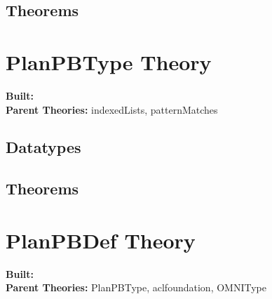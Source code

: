 \documentclass[11pt, twoside]{article}
\begin{document}


\subsection{Theorems}

\HOLssmPlanPBTheorems

\section{PlanPBType Theory}
\begin{flushleft}
\textbf{Built:} \HOLPlanPBTypeDate \\[2pt]
\textbf{Parent Theories:} indexedLists, patternMatches
\end{flushleft}

\subsection{Datatypes}

\HOLPlanPBTypeDatatypes


\subsection{Theorems}

\HOLPlanPBTypeTheorems

\section{PlanPBDef Theory}
\begin{flushleft}
\textbf{Built:} \HOLPlanPBDefDate \\[2pt]
\textbf{Parent Theories:} PlanPBType, aclfoundation, OMNIType
\end{flushleft}
\end{document}
